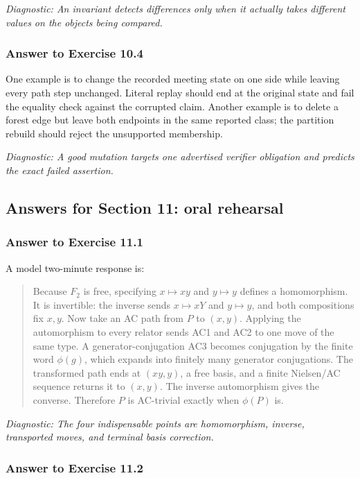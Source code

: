 \documentclass[11pt]{article}
\theoremstyle{definition}
\theoremstyle{remark}
\newcommand{\diagnostic}[1]{\par\smallskip\textit{Diagnostic: #1}}
\begin{document}
\diagnostic{An invariant detects differences only when it actually takes
different values on the objects being compared.}

\subsubsection*{Answer to Exercise 10.4}

One example is to change the recorded meeting state on one side while
leaving every path step unchanged.  Literal replay should end at the
original state and fail the equality check against the corrupted claim.
Another example is to delete a forest edge but leave both endpoints in the
same reported class; the partition rebuild should reject the unsupported
membership.

\diagnostic{A good mutation targets one advertised verifier obligation and
predicts the exact failed assertion.}

\subsection*{Answers for Section 11: oral rehearsal}

\subsubsection*{Answer to Exercise 11.1}

A model two-minute response is:

\begin{quote}
Because \(F_2\) is free, specifying \(x\mapsto xy\) and \(y\mapsto y\)
defines a homomorphism.  It is invertible: the inverse sends
\(x\mapsto xY\) and \(y\mapsto y\), and both compositions fix \(x,y\).
Now take an AC path from \(P\) to \((x,y)\).  Applying the automorphism to
every relator sends AC1 and AC2 to one move of the same type.  A
generator-conjugation AC3 becomes conjugation by the finite word
\(\phi(g)\), which expands into finitely many generator conjugations.  The
transformed path ends at \((xy,y)\), a free basis, and a finite Nielsen/AC
sequence returns it to \((x,y)\).  The inverse automorphism gives the
converse.  Therefore \(P\) is AC-trivial exactly when \(\phi(P)\) is.
\end{quote}

\diagnostic{The four indispensable points are homomorphism, inverse,
transported moves, and terminal basis correction.}

\subsubsection*{Answer to Exercise 11.2}
\end{document}
